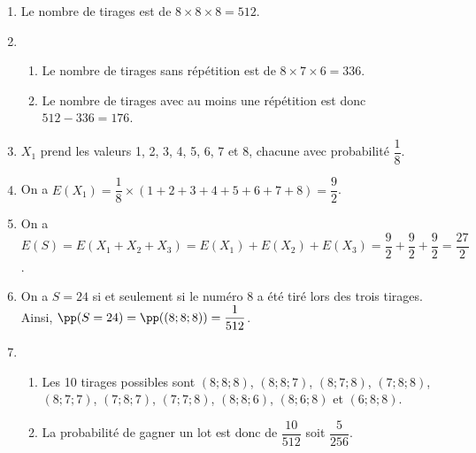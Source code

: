\documentclass[11pt,fleqn, openany]{book} %
\begin{document}
\begin{solution}\hspace{0pt}

\begin{enumerate}
\item Le nombre de tirages est de $8 \times 8 \times 8=512$.
\item \begin{enumerate}
\item Le nombre de tirages sans répétition est de $8 \times 7 \times 6=336$.
\item Le nombre de tirages avec au moins une répétition est donc $512-336=176$.
\end{enumerate}
\item $X_1$ prend les valeurs 1, 2, 3, 4, 5, 6, 7 et 8, chacune avec probabilité $\dfrac{1}{8}$.
\item On a $E(X_1)=\dfrac{1}{8} \times (1+2+3+4+5+6+7+8)=\dfrac{9}{2}$.
\item On a $E(S)=E(X_1+X_2+X_3)=E(X_1)+E(X_2)+E(X_3)=\dfrac{9}{2}+\dfrac{9}{2}+\dfrac{9}{2}=\dfrac{27}{2}$.
\item On a $S=24$ si et seulement si le numéro 8 a été tiré lors des trois tirages. Ainsi, $\pp(S=24)=\pp((8;8;8))=\dfrac{1}{512}$.
\item \begin{enumerate}
\item Les 10 tirages possibles sont $(8;8;8)$, $(8;8;7)$, $(8;7;8)$, $(7;8;8)$, $(8;7;7)$, $(7;8;7)$, $(7;7;8)$, $(8;8;6)$, $(8;6;8)$ et $(6;8;8)$.
\item La probabilité de gagner un lot est donc de $\dfrac{10}{512}$ soit $\dfrac{5}{256}$.
\end{enumerate}
\end{enumerate}

\end{solution}
\end{document}
